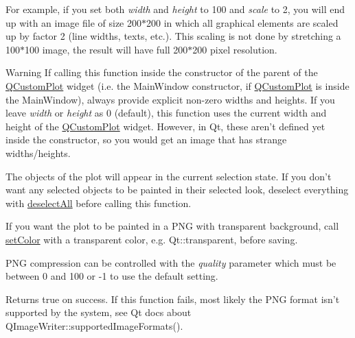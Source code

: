 For example, if you set both {\itshape width} and {\itshape height} to 100 and {\itshape scale} to 2, you will end up with an image file of size 200$\ast$200 in which all graphical elements are scaled up by factor 2 (line widths, texts, etc.). This scaling is not done by stretching a 100$\ast$100 image, the result will have full 200$\ast$200 pixel resolution.

\begin{DoxyWarning}{Warning}
If calling this function inside the constructor of the parent of the \hyperlink{classQCustomPlot}{Q\-Custom\-Plot} widget (i.\-e. the Main\-Window constructor, if \hyperlink{classQCustomPlot}{Q\-Custom\-Plot} is inside the Main\-Window), always provide explicit non-\/zero widths and heights. If you leave {\itshape width} or {\itshape height} as 0 (default), this function uses the current width and height of the \hyperlink{classQCustomPlot}{Q\-Custom\-Plot} widget. However, in Qt, these aren't defined yet inside the constructor, so you would get an image that has strange widths/heights.
\end{DoxyWarning}
The objects of the plot will appear in the current selection state. If you don't want any selected objects to be painted in their selected look, deselect everything with \hyperlink{classQCustomPlot_a9d4808ab925b003054085246c92a257c}{deselect\-All} before calling this function.

If you want the plot to be painted in a P\-N\-G with transparent background, call \hyperlink{classQCustomPlot_a900feeb82a58f3594b8bb367571c17c8}{set\-Color} with a transparent color, e.\-g. Qt\-::transparent, before saving.

P\-N\-G compression can be controlled with the {\itshape quality} parameter which must be between 0 and 100 or -\/1 to use the default setting.

Returns true on success. If this function fails, most likely the P\-N\-G format isn't supported by the system, see Qt docs about Q\-Image\-Writer\-::supported\-Image\-Formats().

